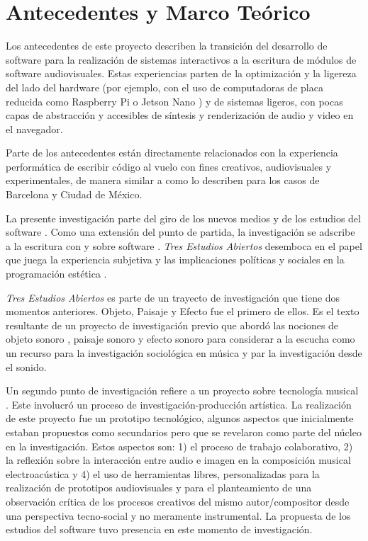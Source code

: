 
\section*{Antecedentes y Marco Teórico}


Los antecedentes de este proyecto describen la transición del desarrollo de software para la realización de sistemas interactivos a la escritura de módulos de software audiovisuales. Estas experiencias parten de la optimización y la ligereza del lado del hardware (por ejemplo, con el uso de computadoras de placa reducida como Raspberry Pi o Jetson Nano ) y de sistemas ligeros, con pocas capas de abstracción y accesibles de síntesis y renderización de audio y video en el navegador.

Parte de los antecedentes están directamente relacionados con la experiencia performática de escribir código al vuelo con fines creativos, audiovisuales y experimentales, de manera similar a como lo describen \cite{villasenor} para los casos de Barcelona y Ciudad de México. 

La presente investigación parte del giro de los nuevos medios y de los estudios del software \citep{manovichlanguage}. Como una extensión del punto de partida, la investigación se adscribe a la escritura con y sobre software \citep{aestheticProgramming}. \textit{Tres Estudios Abiertos} desemboca en el papel que juega la experiencia subjetiva y las implicaciones políticas y sociales en la programación estética \citep{speakingCode}. 

\textit{Tres Estudios Abiertos} es parte de un trayecto de investigación que tiene dos momentos anteriores. Objeto, Paisaje y Efecto \citep{ocelotlLic} fue el primero de ellos. Es el texto resultante de un proyecto de investigación previo que abordó las nociones de objeto sonoro \citep{schaeffer}, paisaje sonoro\citep{schafer1} y efecto sonoro \citep{augoyard} para considerar a la escucha como un recurso para la investigación sociológica en música y par la investigación desde el sonido. 

Un segundo punto de investigación refiere a un proyecto sobre tecnología musical \citep{ocelotlMas}. Este involucró un proceso de investigación-producción artística. La realización de este proyecto fue un prototipo tecnológico, algunos aspectos que inicialmente estaban propuestos como secundarios pero que se revelaron como parte del núcleo en la investigación. Estos aspectos son: 1) el proceso de trabajo colaborativo, 2) la reflexión sobre la interacción entre audio e imagen en la composición musical electroacústica y 4) el uso de herramientas libres, personalizadas para la realización de prototipos audiovisuales y para el planteamiento de una observación crítica de los procesos creativos del mismo autor/compositor desde una perspectiva tecno-social y no meramente instrumental. La propuesta de los estudios del software tuvo presencia en este momento de investigación. 

